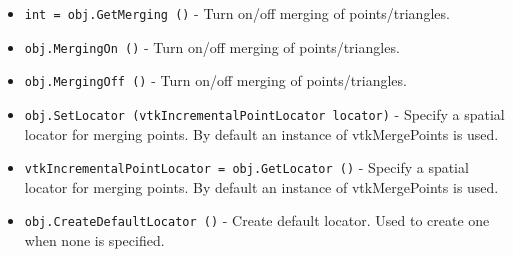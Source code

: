 \begin{itemize}
\item  \verb|int = obj.GetMerging ()| -  Turn on/off merging of points/triangles.

\item  \verb|obj.MergingOn ()| -  Turn on/off merging of points/triangles.

\item  \verb|obj.MergingOff ()| -  Turn on/off merging of points/triangles.

\item  \verb|obj.SetLocator (vtkIncrementalPointLocator locator)| -  Specify a spatial locator for merging points. By
 default an instance of vtkMergePoints is used.

\item  \verb|vtkIncrementalPointLocator = obj.GetLocator ()| -  Specify a spatial locator for merging points. By
 default an instance of vtkMergePoints is used.

\item  \verb|obj.CreateDefaultLocator ()| -  Create default locator. Used to create one when none is specified.

\end{itemize}
